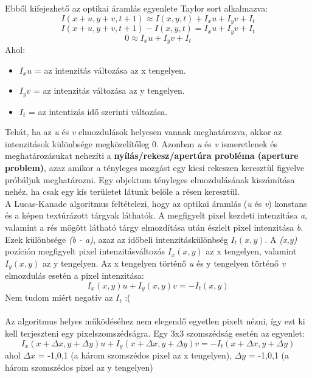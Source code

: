 \documentclass[12pt]{report}
\begin{document}
\begin{enumerate}
                    Ebből kifejezhető az optikai áramlás egyenlete Taylor sort alkalmazva:
                    \[I(x + u,y + v,t + 1) \approx I(x,y,t) + I_xu + I_yv + I_t\]
                    \[I(x + u,y + v,t + 1) - I(x,y,t) = I_xu + I_yv + I_t\]
                    \[0 \approx I_xu + I_yv + I_t\]
                    Ahol:
                    \begin{itemize}
                        \item \textit{$I_xu$} = az intenzitás változása az x tengelyen.
                        \item \textit{$I_yv$} = az intenzitás változása az y tengelyen.
                        \item \textit{$I_t$} = az intentizás idő szerinti változása.
                    \end{itemize}
                    Tehát, ha az \textit{u} és \textit{v} elmozdulások helyesen vannak meghatározva, akkor az intenzitások különbsége megközelítőleg 0. Azonban \textit{u} és \textit{v} ismeretlenek és meghatározásukat nehezíti a \textbf{nyílás/rekesz/apertúra probléma (aperture problem)}, azaz amikor a tényleges mozgást egy kicsi rekeszen keresztül figyelve próbáljuk meghatározni. Egy objektum tényleges elmozdulásának kiszámítása nehéz, ha csak egy kis területet látunk belőle a résen keresztül.\\
                    A Lucas-Kanade algoritmus feltételezi, hogy az optikai áramlás (\textit{u} és \textit{v}) konstans és a képen textúrázott tárgyak láthatók. A megfigyelt pixel kezdeti intenzitása \textit{a}, valamint a rés mögött látható tárgy elmozdítása után észlelt pixel intenzitása \textit{b}. Ezek különbsége \textit{(b - a)}, azaz az időbeli intenzitáskülönbség \textit{$I_t(x,y)$}. A \textit{(x,y)} pozíción megfigyelt pixel intenzitásváltozás \textit{$I_x(x,y)$} az x tengelyen, valamint \textit{$I_y(x,y)$} az y tengelyen. Az x tengelyen történő \textit{u} és y tengelyen történő \textit{v} elmozdulás esetén a pixel intenzitása:
                    \[I_x(x,y)u + I_y(x,y)v = -I_t(x,y)\]
                    Nem tudom miért negatív az $I_t$ :(\\\\
                    Az algoritmus helyes működéséhez nem elegendő egyetlen pixelt nézni, így ezt ki kell terjeszteni egy pixelszomszédságra. Egy 3x3 szomszédság esetén az egyenlet:
                    \[I_x(x + \Delta x, y + \Delta y)u + I_y(x + \Delta x, y + \Delta y)v = -I_t(x + \Delta x, y + \Delta y)\] ahol $\Delta x$ = -1,0,1 (a három szomszédos pixel az x tengelyen), $\Delta y$ = -1,0,1 (a három szomszédos pixel az y tengelyen)

\end{enumerate}
\end{document}
